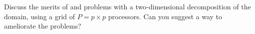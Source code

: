   Discuss the merits of and problems with a two-dimensional
  decomposition of the domain, using a grid of $P=p\times p$
  processors. Can you suggest a way to ameliorate the problems?
